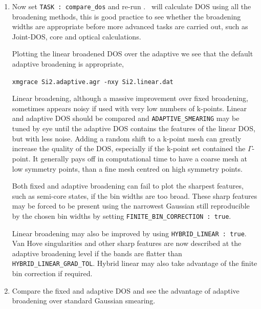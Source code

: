 \documentclass[a4paper,11pt,twoside]{book}
\begin{document}
{\begin{enumerate}
\item  Now set {\tt TASK : compare\_dos} and re-run \optados. \optados\ will calculate DOS using all the broadening methods, this is good practice to see whether the broadening widths are appropriate before more advanced tasks are carried out, such as Joint-DOS, core and optical calculations.

Plotting the linear broadened DOS over the adaptive we see that the default adaptive broadening is appropriate,

\verb#xmgrace Si2.adaptive.agr -nxy Si2.linear.dat#

Linear broadening, although a massive improvement over fixed broadening, sometimes appears noisy if used with very low numbers of k-points. Linear and adaptive DOS should be compared and \verb#ADAPTIVE_SMEARING# may be tuned by eye until the adaptive DOS contains the features of the linear DOS, but with less noise.  Adding a random shift to a k-point mesh can greatly increase the quality of the DOS, especially if the k-point set contained the $\Gamma$-point. It generally pays off in computational time to have a coarse mesh at low symmetry points, than a fine mesh centred on high symmetry points.

Both fixed and adaptive broadening can fail to plot the sharpest features, such as semi-core states, if the bin widths are too broad. These sharp features may be forced to be present using the narrowest Gaussian still reproducible by the chosen bin widths by setting \verb#FINITE_BIN_CORRECTION : true#.

Linear broadening may also be improved by using \verb#HYBRID_LINEAR : true#. Van Hove singularities and other sharp features are now described at the adaptive broadening level if the bands are flatter than \verb#HYBRID_LINEAR_GRAD_TOL#. Hybrid linear may also take advantage of the finite bin correction if required.

\item Compare the fixed and adaptive DOS and see the advantage of adaptive broadening over standard Gaussian smearing.

\end{enumerate}


}
\end{document}

